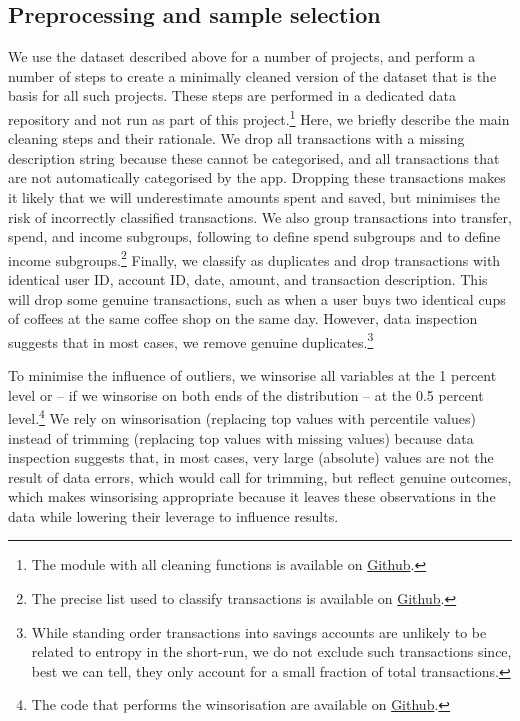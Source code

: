 \subsection{Preprocessing and sample selection}%
\label{par:preprocessing_and_sample_selection}

We use the dataset described above for a number of projects, and perform a
number of steps to create a minimally cleaned version of the dataset that is
the basis for all such projects. These steps are performed in a dedicated data
repository and not run as part of this project.\footnote{The module with all
cleaning functions is available on
\href{https://github.com/fabiangunzinger/entropy/blob/27a210e2f42dfe23a867dbc20c8ef3253d050aaa/src/data/clean.py}{Github}.}
Here, we briefly describe the main cleaning steps and their rationale. We drop
all transactions with a missing description string because these cannot be
categorised, and all transactions that are not automatically categorised by the
app. Dropping these transactions makes it likely that we will underestimate
amounts spent and saved, but minimises the risk of incorrectly classified
transactions. We also group transactions into transfer, spend, and income
subgroups, following \citet{muggleton2020evidence} to define spend subgroups
and \citet{hacioglu2021distributional} to define income subgroups.\footnote{
The precise list used to classify transactions is available on
\href{https://github.com/fabiangunzinger/entropy/blob/27a210e2f42dfe23a867dbc20c8ef3253d050aaa/src/data/txn_classifications.py}{Github}.}
Finally, we classify as duplicates and drop transactions with identical user
ID, account ID, date, amount, and transaction description. This will drop some
genuine transactions, such as when a user buys two identical cups of coffees at
the same coffee shop on the same day. However, data inspection suggests that in
most cases, we remove genuine duplicates.\footnote{While standing order
    transactions into savings accounts are unlikely to be related to entropy in
    the short-run, we do not exclude such transactions since, best we can tell,
they only account for a small fraction of total transactions.}

To minimise the influence of outliers, we winsorise all variables at the 1
percent level or -- if we winsorise on both ends of the distribution -- at the
0.5 percent level.\footnote{The code that performs the winsorisation are
    available on
\href{https://github.com/fabiangunzinger/entropy/blob/27a210e2f42dfe23a867dbc20c8ef3253d050aaa/src/data/transformers.py}{Github}.}
We rely on winsorisation (replacing top values with percentile values) instead
of trimming (replacing top values with missing values) because data inspection
suggests that, in most cases, very large (absolute) values are not the result of
data errors, which would call for trimming, but reflect genuine outcomes, which
makes winsorising appropriate because it leaves these observations in the data
while lowering their leverage to influence results.

